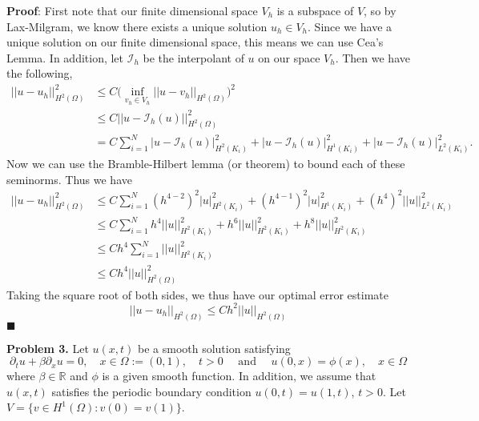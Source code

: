 \documentclass[11pt]{article}
\begin{document}
{\bf Proof}: First note that our finite dimensional space $V_h$ is a subspace of $V$, so by Lax-Milgram, we know there exists a unique solution $u_h\in V_h$.
Since we have a unique solution on our finite dimensional space, this means we can use Cea's Lemma.
In addition, let $\mathcal{I}_h$ be the interpolant of $u$ on our space $V_h$. Then we have the following,
\begin{align*}
	||u - u_h||_{H^2(\Omega)}^2 &\leq C \Big(\inf_{v_h\in V_h} ||u - v_h||_{H^2(\Omega)}\Big)^2 \\
	&\leq C||u - \mathcal{I}_h(u)||_{H^2(\Omega)}^2 \\
	&= C\sum_{i=1}^N |u - \mathcal{I}_h(u)|^2_{H^2(K_i)} + |u- \mathcal{I}_h(u)|^2_{H^1(K_i)} + |u - \mathcal{I}_h(u)|^2_{L^2(K_i)}.
\end{align*}
Now we can use the Bramble-Hilbert lemma (or theorem) to bound each of these seminorms. Thus we have 
\begin{align*}
	||u - u_h||_{H^2(\Omega)}^2 &\leq C\sum_{i=1}^N (h^{4-2})^2|u|_{H^2(K_i)}^2 + (h^{4-1})^2|u|_{H^1(K_i)}^2 + (h^4)^2||u||_{L^2(K_i)}^2 \\
	&\leq C\sum_{i=1}^N h^4||u||_{H^2(K_i)}^2 + h^6||u||_{H^2(K_i)}^2 + h^8||u||_{H^2(K_i)}^2 \\
	&\leq Ch^4\sum_{i=1}^N ||u||_{H^2(K_i)}^2 \\
	&\leq Ch^4||u||_{H^2(\Omega)}^2
\end{align*}
Taking the square root of both sides, we thus have our optimal error estimate
\[ ||u - u_h||_{H^2(\Omega)} \leq Ch^2||u||_{H^2(\Omega)} \]
$\blacksquare$


\vskip 2cm




\textbf{Problem 3.} Let $u(x,t)$ be a smooth solution satisfying
\begin{equation}
    \partial_t u + \beta \partial_x u = 0, \quad x \in \Omega := (0,1), \quad t > 0 \quad \text{ and } \quad u(0,x) = \phi(x), \quad x\in \Omega
\end{equation}
where $\beta \in \mathbb{R}$ and $\phi$ is a given smooth function.
In addition, we assume that $u(x,t)$ satisfies the periodic boundary condition $u(0,t) = u(1,t)$, $t > 0$. 
Let $V = \{ v \in H^1(\Omega) : v(0) = v(1) \}$.


\vskip 1cm
\end{document}

